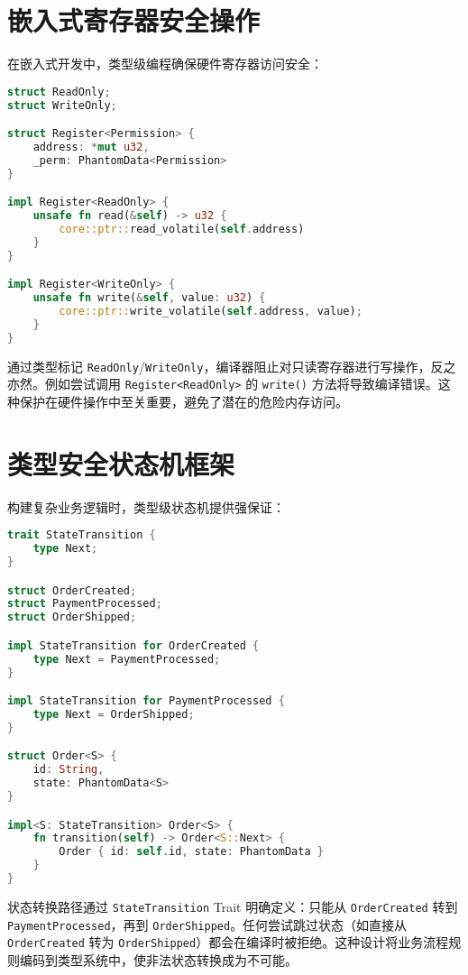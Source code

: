 \section{嵌入式寄存器安全操作}
在嵌入式开发中，类型级编程确保硬件寄存器访问安全：\par
\begin{lstlisting}[language=rust]
struct ReadOnly;
struct WriteOnly;

struct Register<Permission> {
    address: *mut u32,
    _perm: PhantomData<Permission>
}

impl Register<ReadOnly> {
    unsafe fn read(&self) -> u32 {
        core::ptr::read_volatile(self.address)
    }
}

impl Register<WriteOnly> {
    unsafe fn write(&self, value: u32) {
        core::ptr::write_volatile(self.address, value);
    }
}
\end{lstlisting}
通过类型标记 \texttt{ReadOnly}/\texttt{WriteOnly}，编译器阻止对只读寄存器进行写操作，反之亦然。例如尝试调用 \texttt{Register<ReadOnly>} 的 \texttt{write()} 方法将导致编译错误。这种保护在硬件操作中至关重要，避免了潜在的危险内存访问。\par
\section{类型安全状态机框架}
构建复杂业务逻辑时，类型级状态机提供强保证：\par
\begin{lstlisting}[language=rust]
trait StateTransition {
    type Next;
}

struct OrderCreated;
struct PaymentProcessed;
struct OrderShipped;

impl StateTransition for OrderCreated {
    type Next = PaymentProcessed;
}

impl StateTransition for PaymentProcessed {
    type Next = OrderShipped;
}

struct Order<S> {
    id: String,
    state: PhantomData<S>
}

impl<S: StateTransition> Order<S> {
    fn transition(self) -> Order<S::Next> {
        Order { id: self.id, state: PhantomData }
    }
}
\end{lstlisting}
状态转换路径通过 \texttt{StateTransition} Trait 明确定义：只能从 \texttt{OrderCreated} 转到 \texttt{PaymentProcessed}，再到 \texttt{OrderShipped}。任何尝试跳过状态（如直接从 \texttt{OrderCreated} 转为 \texttt{OrderShipped}）都会在编译时被拒绝。这种设计将业务流程规则编码到类型系统中，使非法状态转换成为不可能。\par
